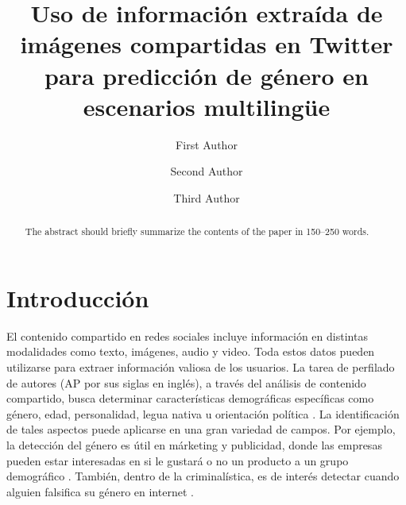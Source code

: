 \documentclass[runningheads]{llncs}
\begin{document}
%
\title{Uso de información extraída de imágenes compartidas en Twitter para predicción de género en escenarios multilingüe}


\author{First Author \and
Second Author \and
Third Author}
%
%

\maketitle

\begin{abstract}
The abstract should briefly summarize the contents of the paper in
150--250 words.

\end{abstract}

\section{Introducción}

El contenido compartido en redes sociales incluye información 
en distintas modalidades como texto, imágenes, audio y video.
Toda estos datos pueden utilizarse para extraer información
valiosa de los usuarios. 
La tarea de perfilado de autores (AP por sus siglas en inglés), a través
del análisis de contenido compartido, busca determinar características demográficas 
específicas como género, edad, personalidad, legua nativa u orientación 
política \cite{rangel_rosso_montes-y-gomez_potthast_stein}. La identificación de tales 
aspectos puede aplicarse en una gran variedad de campos. Por ejemplo, la detección del 
género es útil en márketing y publicidad, donde las empresas pueden estar interesadas
en si le gustará o no un producto a un grupo demográfico \cite{miller_dickinson_hu_2012}.
También, dentro de la criminalística, es de interés detectar cuando alguien falsifica su género en internet \cite{cheng_chandramouli_subbalakshmi_2011}. 
\end{document}
